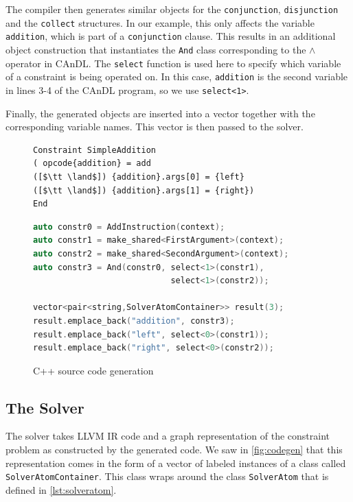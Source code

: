     The compiler then generates similar objects for the
    \texttt{conjunction}, \texttt{disjunction} and the \texttt{collect} structures.
    In our example, this only affects the variable \texttt{addition}, which is
    part of a \texttt{conjunction} clause.
    This results in an additional object construction that instantiates the
    \texttt{And} class corresponding to the {\bf $\land$} operator in CAnDL.
    The \texttt{select} function is used here to specify which variable of a
    constraint is being operated on.
    In this case, \texttt{addition} is the second variable in lines 3-4 of the
    CAnDL program, so we use \texttt{select<1>}.

    Finally, the generated objects are inserted into a vector together with the
    corresponding variable names.
    This vector is then passed to the solver.

\begin{figure}[ht]
\centering
\begin{lstlisting}[language=CAnDL]
Constraint SimpleAddition
( opcode{addition} = add
([$\tt \land$]) {addition}.args[0] = {left}
([$\tt \land$]) {addition}.args[1] = {right})
End
\end{lstlisting}
\begin{lstlisting}[language=C++]
auto constr0 = AddInstruction(context);
auto constr1 = make_shared<FirstArgument>(context);
auto constr2 = make_shared<SecondArgument>(context);
auto constr3 = And(constr0, select<1>(constr1),
                            select<1>(constr2));

vector<pair<string,SolverAtomContainer>> result(3);
result.emplace_back("addition", constr3);
result.emplace_back("left", select<0>(constr1));
result.emplace_back("right", select<0>(constr2));
\end{lstlisting}
\vspace{-0.3cm}
\caption{C++ source code generation}
\label{fig:codegen}
\end{figure}

\subsection{The Solver}

    The solver takes  LLVM IR code and a graph representation of the constraint
    problem as constructed by the generated code.
    We saw in \autoref{fig:codegen} that this representation comes in the form
    of a vector of labeled instances of a class called
    \texttt{SolverAtomContainer}.
    This class wraps around the class \texttt{SolverAtom} that is defined in
    \autoref{lst:solveratom}.

